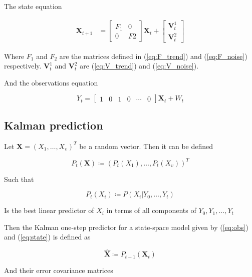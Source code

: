 The state equation

\begin{align}
	\bm{X}_{t+1}	&= 
	\begin{bmatrix}
		F_1	& 0 \\
		0	& F2
	\end{bmatrix} \bm{X}_{t} +
	\begin{bmatrix}
		\bm{V}_t^1 \\
		\bm{V}_t^2
	\end{bmatrix}
\end{align}

Where $F_1$ and $F_2$ are the matrices defined in (\ref{eq:F_trend}) and (\ref{eq:F_noise}) respectively. $\bm{V}_t^1$ and $\bm{V}_t^2$ are (\ref{eq:V_trend}) and (\ref{eq:V_noise}).


And the observations equation

\begin{equation}
	Y_t = 	\begin{bmatrix}1 & 0 & 1 & 0 & \cdots & 0\end{bmatrix}\bm{X}_{t} + W_t
\end{equation}



\subsection{Kalman prediction}

Let $\bm{X} = (X_1, \ldots, X_v)^T$ be a random vector. Then it can be defined 

\begin{equation}
	P_t(\bm{X}) \coloneqq (P_t(X_1), \ldots, P_t(X_v))^T
\end{equation}

Such that 

\begin{equation}
	P_t(X_i) \coloneqq P(X_i | Y_0, \ldots, Y_t)
\end{equation}

Is the best linear predictor of $X_i$ in terms of all components of $Y_0, Y_1, \ldots, Y_t$\cite{brockwell2016introduction}


Then the Kalman one-step predictor for a state-space model given by (\ref{eq:obs}) and (\ref{eq:state}) is defined as 

\begin{equation}
	\hat{\bm{X}} \coloneqq P_{t-1}(\bm{X}_t)
\end{equation}

And their error covariance matrices

